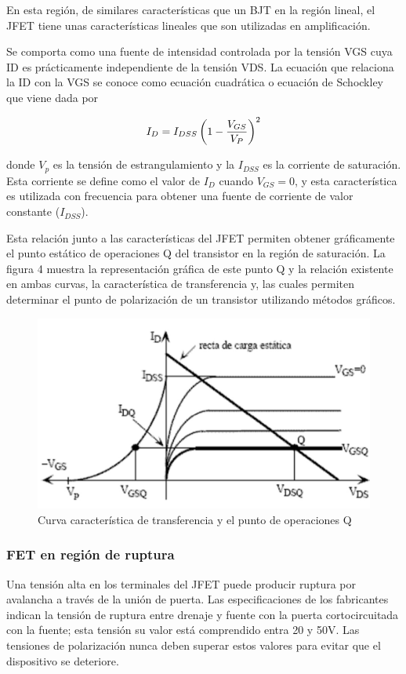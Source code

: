 \documentclass[12pt, a4paper]{article}
\begin{document}
    En esta región, de similares características que un BJT en la región lineal, el JFET tiene unas características lineales que son utilizadas en amplificación.

    Se comporta como una fuente de intensidad controlada por la tensión VGS cuya ID es prácticamente independiente de la tensión VDS. La ecuación que relaciona la ID con la VGS se conoce como ecuación cuadrática o ecuación de Schockley que viene dada por

    $$I_D = I_{DSS}\left( 1-{V_{GS} \over V_P}\right) ^2$$

    donde $V_p$ es la tensión de estrangulamiento y la $I_{DSS}$ es la corriente de saturación. Esta corriente se define como el valor de $I_D$ cuando $V_{GS}=0$, y esta característica es utilizada con frecuencia para obtener una fuente de corriente de valor constante ($I_{DSS}$).

    Esta relación junto a las características del JFET permiten obtener gráficamente el punto estático de operaciones Q del transistor en la región de saturación. La figura 4 muestra la representación gráfica de este punto Q y la relación existente en ambas curvas, la característica de transferencia y, las cuales permiten determinar el punto de polarización de un transistor utilizando métodos gráficos.

    \begin{figure}[h!]
        \centering
        \includegraphics[height=5cm\textwidth]{curvafet.jpg}
        \caption{Curva característica de transferencia y el punto de operaciones Q}
        \label{fig:t4}
    \end{figure}

    \subsubsection{FET en región de ruptura}

    Una tensión alta en los terminales del JFET puede producir ruptura por avalancha a través de la unión de puerta. Las especificaciones de los fabricantes indican la tensión de ruptura entre drenaje y fuente con la puerta cortocircuitada con la fuente; esta tensión su valor está comprendido entra 20 y 50V. Las tensiones de polarización nunca deben superar estos valores para evitar que el dispositivo se deteriore.
\end{document}
